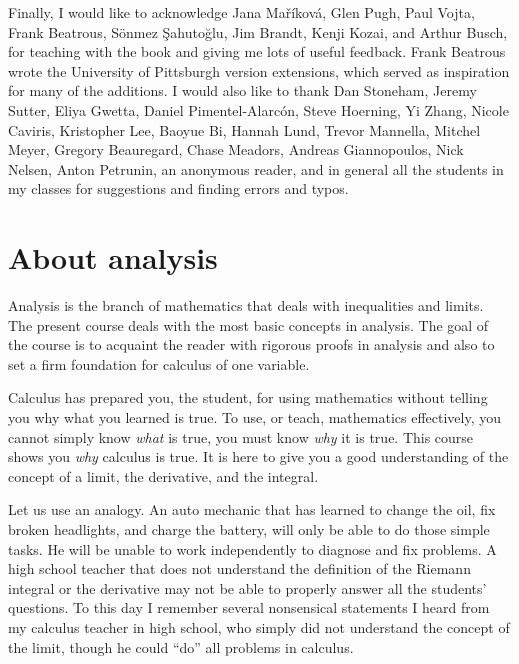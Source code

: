\documentclass[12pt]{book}
\newcommand{\sectionnewpage}{\clearpage}
\theoremstyle{plain}
\theoremstyle{remark}
\theoremstyle{definition}
\theoremstyle{exercise}
\theoremstyle{example}
\begin{document}
\medskip

Finally, I would like to acknowledge Jana Ma\v{r}\'ikov\'a,
Glen Pugh, Paul Vojta, Frank Beatrous, S\"{o}nmez \c{S}ahuto\u{g}lu,
Jim Brandt, Kenji Kozai, and Arthur Busch,
for teaching with the book and giving me lots of useful feedback.
Frank Beatrous wrote the University of Pittsburgh version extensions, which
served as inspiration for many of the additions.
I would also like to thank
Dan Stoneham, Jeremy Sutter, Eliya Gwetta, Daniel Pimentel-Alarc\'on,
Steve Hoerning, Yi Zhang, Nicole Caviris,
Kristopher Lee, Baoyue Bi, Hannah Lund,
Trevor Mannella, Mitchel Meyer, Gregory Beauregard,
Chase Meadors, Andreas Giannopoulos, Nick Nelsen, Anton Petrunin,
an anonymous reader, and in general all the students in my classes for suggestions and
finding errors and typos.


\sectionnewpage
\section{About analysis} \label{sec:aboutra}

Analysis is the branch of mathematics that deals with inequalities and
limits.  The present course deals with the most basic 
concepts in analysis.  The goal of the course is to acquaint the reader
with rigorous proofs in analysis and also to
set a firm foundation for calculus of one variable.

Calculus has prepared you, the student, for using mathematics without telling
you why what you learned is true.  To use, or teach, mathematics
effectively, you cannot simply know \emph{what} is true, you must know
\emph{why} it is true.  This course shows you \emph{why} calculus
is true.  It is here to give you a good understanding of the concept of a
limit, the derivative, and the integral.

Let us use an analogy.
An auto mechanic that has learned to change the oil, fix broken headlights,
and charge the battery, will only be able to do those simple tasks.  He
will be unable to work independently to diagnose and fix problems.
A high school teacher that does not understand the definition of the Riemann
integral or the derivative may not be able to properly answer all the
students' questions.
To this day I remember several nonsensical statements I heard
from my calculus teacher in high school, who simply did not understand
the concept of the limit, though he could ``do'' all problems in calculus.
\end{document}
